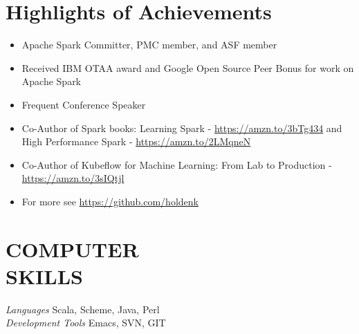 \documentclass[10pt,line,margin=0.1]{newsres}
\begin{document}
\address{San Francisco, CA, USA}
\address{E-mail: holden@pigscanfly.ca, Cell: (425) 233-8271}
 
\begin{resume}
  \section{Highlights of Achievements}
  \begin{itemize}  \itemsep -2pt %
  \item{Apache Spark Committer, PMC member, and ASF member}
  \item{Received IBM OTAA award and Google Open Source Peer Bonus for work on Apache Spark}
  \item{Frequent Conference Speaker}
  \item{Co-Author of Spark books: Learning Spark - \url{https://amzn.to/3bTg434} and High Performance Spark - \url{https://amzn.to/2LMqneN}}
  \item{Co-Author of Kubeflow for Machine Learning: From Lab to Production  - \url{https://amzn.to/3sIQtjl}}
  \item{For more see \url{https://github.com/holdenk}}
\end{itemize}
\section{COMPUTER \\ SKILLS} {\sl Languages} Scala, Scheme, Java, Perl \\
                {\sl Development Tools} Emacs, SVN, GIT \\
 

\end{resume}
\end{document}
